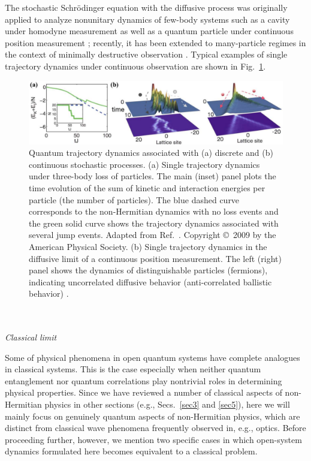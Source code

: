 \documentclass{tADP2e}
\theoremstyle{plain}
\theoremstyle{plain}
\theoremstyle{definition}
\begin{document}
The stochastic Schr{\"o}dinger equation with the diffusive process \cite{NG92} was originally applied to analyze nonunitary dynamics of few-body systems such as a cavity under homodyne measurement {\cite{MJC87,MGJ93}} as well as a quantum particle under continuous position measurement \cite{KJ06,BA13}; recently, it has been extended to many-particle regimes in the context of minimally destructive observation \cite{YA17}. Typical examples of single trajectory dynamics under continuous observation are shown in Fig.~\ref{fig:4traj}.
\begin{figure}[t]
\begin{center}
\includegraphics[width=14.5cm]{./Figures/fig_4_traj.pdf}
\end{center}
\caption{Quantum trajectory dynamics associated with (a) discrete and (b) continuous stochastic processes. (a) Single trajectory dynamics under three-body loss of particles. The main (inset) panel plots the time evolution of the sum of kinetic and interaction energies per particle (the number of particles). The blue dashed curve corresponds to the non-Hermitian dynamics with no loss events  and the green solid curve shows the trajectory dynamics associated with several jump events.
Adapted from Ref.~\cite{DAJ09}. Copyright \copyright\,  2009 by the American Physical Society.
 (b) Single trajectory dynamics in the diffusive limit of a continuous position measurement. The left (right) panel shows the dynamics of distinguishable particles (fermions), indicating uncorrelated diffusive behavior (anti-correlated ballistic behavior) \cite{YA17}.   }
\label{fig:4traj}
\end{figure}
\\ \\ {\it Classical limit}

\vspace{3pt}
\noindent
Some of physical phenomena in open quantum systems have complete analogues in  classical systems. This is the case especially when neither quantum entanglement nor quantum correlations play nontrivial roles in determining physical properties. Since we have reviewed a number of classical aspects of non-Hermitian physics in other sections (e.g., Secs.~\ref{sec3} and \ref{sec5}), here we will mainly focus on genuinely quantum aspects of non-Hermitian physics, which are distinct from classical wave phenomena frequently observed in, e.g., optics. 
Before proceeding further, however, we mention two specific cases in which open-system dynamics formulated here becomes equivalent to a classical problem. 
\end{document}
